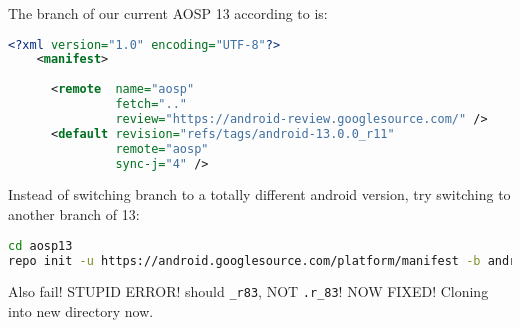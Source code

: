 The branch of our current AOSP 13 according to  is:
\begin{lstlisting}[language=xml]
<?xml version="1.0" encoding="UTF-8"?>
    <manifest>
    
      <remote  name="aosp"
               fetch=".."
               review="https://android-review.googlesource.com/" />
      <default revision="refs/tags/android-13.0.0_r11"
               remote="aosp"
               sync-j="4" />
\end{lstlisting}

Instead of switching branch to a totally different android version, try switching to another branch of 13:
\begin{lstlisting}[language=bash]
cd aosp13
repo init -u https://android.googlesource.com/platform/manifest -b android-13.0.0.r_83
\end{lstlisting}
Also fail! STUPID ERROR! should \texttt{\_r83}, NOT \texttt{.r\_83}! NOW FIXED! Cloning into new directory now.







